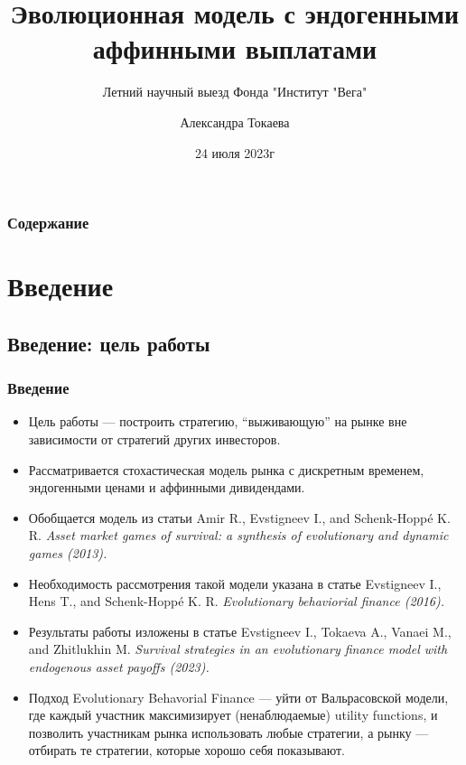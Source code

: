 \documentclass[aspectratio=169]{beamer}
\title{Эволюционная модель с эндогенными аффинными выплатами}
\subtitle{Летний научный выезд Фонда "Институт "Вега"}
\author{Александра Токаева}
\institute{Vega Institute Foundation}
\date{24 июля 2023г}
\theoremstyle{definition}
\theoremstyle{remark}
\begin{document}
    \maketitle
    
    \begin{frame}
    \frametitle{Содержание} 
    \tableofcontents 
    \end{frame}


\section{Введение}
\subsection{Введение: цель работы}
\begin{frame}\frametitle{Введение} 
    \begin{itemize}

    \item Цель работы — построить стратегию, ``выживающую''  на рынке вне зависимости от стратегий других инвесторов.\\
    \item Рассматривается стохастическая модель рынка с дискретным временем, эндогенными ценами и аффинными дивидендами.\\
    \item Обобщается модель из статьи Amir R., Evstigneev I., and Schenk-Hoppé K. R.  {\em Asset market games of survival: a synthesis of evolutionary and dynamic games (2013). }
    \item Необходимость рассмотрения такой модели указана в статье Evstigneev I., Hens T., and Schenk-Hoppé K. R. {\em Evolutionary behaviorial finance (2016).} 
    \item Результаты работы изложены в статье Evstigneev I., Tokaeva A., Vanaei M., and Zhitlukhin M. {\em Survival strategies in an evolutionary finance model with endogenous asset payoffs (2023).}
    \item Подход Evolutionary Behavorial Finance — уйти от Вальрасовской модели, где каждый участник максимизирует (ненаблюдаемые) utility functions, и позволить участникам рынка использовать любые стратегии, а рынку — отбирать те стратегии, которые хорошо себя показывают.
    \end{itemize}
\end{frame}

\end{document}
